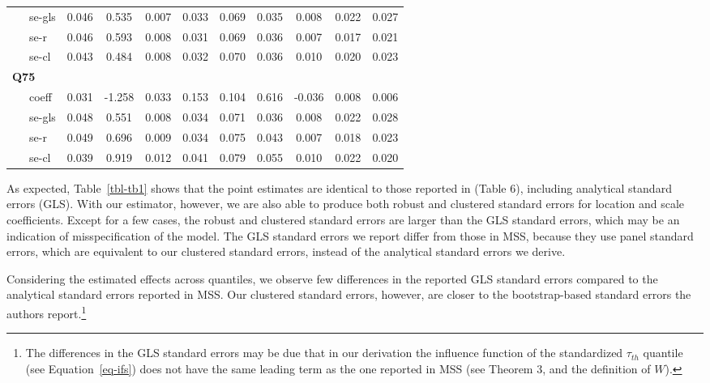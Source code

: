 \documentclass[
  12pt,
  oneside]{article}
\begin{document}
\begin{table}[h]
{\begin{tabular}{lccccccccc}
    \ \ \ se-gls   &  0.046  & 0.535  & 0.007 & 0.033 & 0.069  & 0.035  & 0.008  & 0.022  & 0.027  \\
    \ \ \ se-r     &  0.046  & 0.593  & 0.008 & 0.031 & 0.069  & 0.036  & 0.007  & 0.017  & 0.021  \\
    \ \ \ se-cl    &  0.043  & 0.484  & 0.008 & 0.032 & 0.070  & 0.036  & 0.010  & 0.020  & 0.023  \\
    \hline
    \multicolumn{8}{l}{\textbf{Q75}} \\
    \ \ \ coeff     &  0.031  & -1.258 & 0.033 & 0.153 & 0.104  & 0.616  & -0.036 & 0.008  & 0.006  \\
    \ \ \ se-gls   &  0.048  & 0.551  & 0.008 & 0.034 & 0.071  & 0.036  & 0.008  & 0.022  & 0.028  \\
    \ \ \ se-r     &  0.049  & 0.696  & 0.009 & 0.034 & 0.075  & 0.043  & 0.007  & 0.018  & 0.023  \\
    \ \ \ se-cl    &  0.039  & 0.919  & 0.012 & 0.041 & 0.079  & 0.055  & 0.010  & 0.022  & 0.020  \\
    \bottomrule
    \end{tabular}

}

\end{table}%

As expected, Table~\ref{tbl-tb1} shows that the point estimates are
identical to those reported in \citet{mss2019} (Table 6), including
analytical standard errors (GLS). With our estimator, however, we are
also able to produce both robust and clustered standard errors for
location and scale coefficients. Except for a few cases, the robust and
clustered standard errors are larger than the GLS standard errors, which
may be an indication of misspecification of the model. The GLS standard
errors we report differ from those in MSS, because they use panel
standard errors, which are equivalent to our clustered standard errors,
instead of the analytical standard errors we derive.

Considering the estimated effects across quantiles, we observe few
differences in the reported GLS standard errors compared to the
analytical standard errors reported in MSS. Our clustered standard
errors, however, are closer to the bootstrap-based standard errors the
authors report.\footnote{The differences in the GLS standard errors may
  be due that in our derivation the influence function of the
  standardized \(\tau_{th}\) quantile (see Equation~\ref{eq-ifs}) does
  not have the same leading term as the one reported in MSS (see Theorem
  3, and the definition of \(W\)).}
\end{document}
